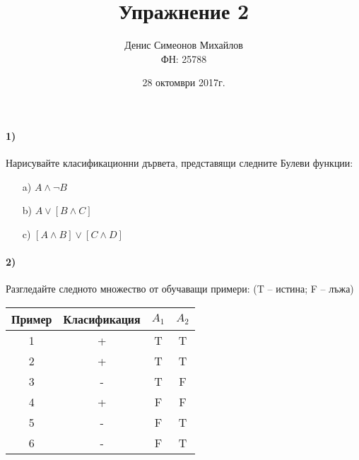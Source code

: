 \documentclass{article}
\begin{document}
\title{Упражнение 2}
\author{Денис Симеонов Михайлов \\ ФН: 25788}
\date{28 октомври 2017г.}
\maketitle
\paragraph{1)}
Нарисувайте класификационни дървета, представящи следните Булеви функции:
\begin{enumerate}
\item [a)]$A \land \neg B$
	\begin{minipage}[t]{\linewidth}
          \raggedright
    \end{minipage}
\item [b)]$A \lor [B \land C]$
	\begin{minipage}[t]{\linewidth}
          \raggedright
    \end{minipage}
\item [c)]$[A \land B] \lor [C \land D]$
	\begin{minipage}[t]{\linewidth}
          \raggedright
    \end{minipage}
\end{enumerate}

\paragraph{2)}
Разгледайте следното множество от обучаващи примери: (T – истина; F – лъжа)

\begin{center}
  \begin{tabular}{ | c | c | c | c |}
    \hline
    Пример & Класификация & $A_1$ & $A_2$ \\ \hline
    1 & + & T & T \\ \hline
    2 & + & T & T \\ \hline
    3 & - & T & F \\ \hline
    4 & + & F & F \\ \hline
    5 & - & F & T \\ \hline
    6 & - & F & T \\ \hline
    \hline
  \end{tabular}
\end{center}
\end{document}

